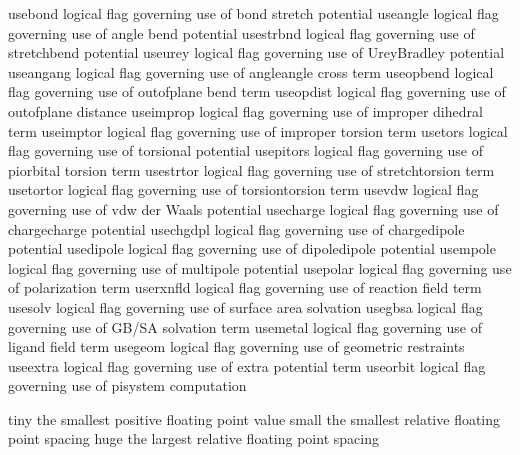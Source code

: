 \documentclass[letterpaper,11pt,english]{sphinxmanual}
\begin{document}

\begin{sphinxVerbatim}[commandchars=\\\{\}]
use\PYGZus{}bond        logical flag governing use of bond stretch potential
use\PYGZus{}angle       logical flag governing use of angle bend potential
use\PYGZus{}strbnd      logical flag governing use of stretch\PYGZhy{}bend potential
use\PYGZus{}urey        logical flag governing use of Urey\PYGZhy{}Bradley potential
use\PYGZus{}angang      logical flag governing use of angle\PYGZhy{}angle cross term
use\PYGZus{}opbend      logical flag governing use of out\PYGZhy{}of\PYGZhy{}plane bend term
use\PYGZus{}opdist      logical flag governing use of out\PYGZhy{}of\PYGZhy{}plane distance
use\PYGZus{}improp      logical flag governing use of improper dihedral term
use\PYGZus{}imptor      logical flag governing use of improper torsion term
use\PYGZus{}tors        logical flag governing use of torsional potential
use\PYGZus{}pitors      logical flag governing use of pi\PYGZhy{}orbital torsion term
use\PYGZus{}strtor      logical flag governing use of stretch\PYGZhy{}torsion term
use\PYGZus{}tortor      logical flag governing use of torsion\PYGZhy{}torsion term
use\PYGZus{}vdw         logical flag governing use of vdw der Waals potential
use\PYGZus{}charge      logical flag governing use of charge\PYGZhy{}charge potential
use\PYGZus{}chgdpl      logical flag governing use of charge\PYGZhy{}dipole potential
use\PYGZus{}dipole      logical flag governing use of dipole\PYGZhy{}dipole potential
use\PYGZus{}mpole       logical flag governing use of multipole potential
use\PYGZus{}polar       logical flag governing use of polarization term
use\PYGZus{}rxnfld      logical flag governing use of reaction field term
use\PYGZus{}solv        logical flag governing use of surface area solvation
use\PYGZus{}gbsa        logical flag governing use of GB/SA solvation term
use\PYGZus{}metal       logical flag governing use of ligand field term
use\PYGZus{}geom        logical flag governing use of geometric restraints
use\PYGZus{}extra       logical flag governing use of extra potential term
use\PYGZus{}orbit       logical flag governing use of pisystem computation
\end{sphinxVerbatim}


\begin{sphinxVerbatim}[commandchars=\\\{\}]
tiny            the smallest positive floating point value
small           the smallest relative floating point spacing
huge            the largest relative floating point spacing
\end{sphinxVerbatim}
\end{document}
